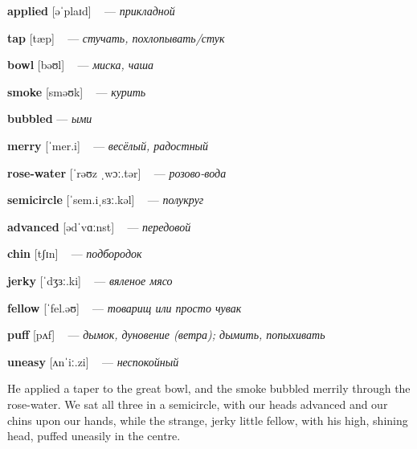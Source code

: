 \documentclass[a4paper,oneside,12pt]{amsart}
\begin{document}
{\large 

 {\bf applied } [əˈplaɪd] ~ --- \emph{ прикладной }

{\bf tap } [tæp] ~ --- \emph{ стучать, похлопывать/стук }

{\bf bowl } [bəʊl] ~ --- \emph{ миска, чаша }

{\bf smoke } [sməʊk] ~ --- \emph{ курить }

{\bf bubbled } --- \emph{ ыми }

{\bf merry } [ˈmer.i] ~ --- \emph{ весёлый, радостный }

{\bf rose-water } [ˈrəʊz ˌwɔː.tər] ~ --- \emph{ розово-вода }

{\bf semicircle } [ˈsem.iˌsɜː.kəl] ~ --- \emph{ полукруг }

{\bf advanced } [ədˈvɑːnst] ~ --- \emph{ передовой }

{\bf chin } [tʃɪn] ~ --- \emph{ подбородок }

{\bf jerky } [ˈdʒɜː.ki] ~ --- \emph{ вяленое мясо }

{\bf fellow } [ˈfel.əʊ] ~ --- \emph{ товарищ или просто чувак }

{\bf puff } [pʌf] ~ --- \emph{ дымок, дуновение (ветра); дымить, попыхивать }

{\bf uneasy } [ʌnˈiː.zi] ~ --- \emph{ неспокойный }

} \vspace{6mm} {\Large 

 
He applied a taper to the great bowl, and the smoke bubbled merrily through the rose-water. We sat all three in a semicircle, with our heads advanced and our chins upon our hands, while the strange, jerky little fellow, with his high, shining head, puffed uneasily in the centre.
\\ } 
\end{document}
